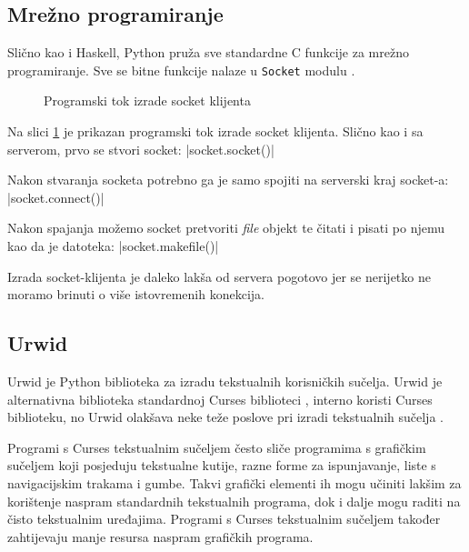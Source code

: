 \subsection{Mrežno programiranje}

Slično kao i Haskell, Python pruža sve standardne C funkcije za mrežno
programiranje. Sve se bitne funkcije nalaze u \texttt{Socket}
modulu \cite{python_socket}.

\begin{figure}[H]
\centering
{}
\caption{Programski tok izrade socket klijenta}
\label{fig:client_creation}
\end{figure}

Na slici \ref{fig:client_creation} je prikazan programski tok izrade socket
klijenta. Slično kao i sa serverom, prvo se stvori socket:
|socket.socket()|

Nakon stvaranja socketa potrebno ga je samo spojiti na serverski kraj socket-a:
|socket.connect()|

Nakon spajanja možemo socket pretvoriti \emph{file} objekt te čitati i pisati po
njemu kao da je datoteka:
|socket.makefile()|

Izrada socket-klijenta je daleko lakša od servera pogotovo jer se nerijetko ne
moramo brinuti o više istovremenih konekcija.

\newpage
\subsection{Urwid}

Urwid je Python biblioteka za izradu tekstualnih korisničkih sučelja. Urwid je
alternativna biblioteka standardnoj Curses biblioteci \cite{curses}, interno
koristi Curses biblioteku, no Urwid olakšava neke teže poslove pri izradi
tekstualnih sučelja \cite{urwid}.

Programi s Curses tekstualnim sučeljem često sliče programima s grafičkim
sučeljem koji posjeduju tekstualne kutije, razne forme za ispunjavanje, liste
s navigacijskim trakama i gumbe. Takvi grafički elementi ih mogu učiniti
lakšim za korištenje naspram standardnih tekstualnih programa, dok i dalje mogu
raditi na čisto tekstualnim uređajima. Programi s Curses tekstualnim sučeljem
također zahtijevaju manje resursa naspram grafičkih programa.

